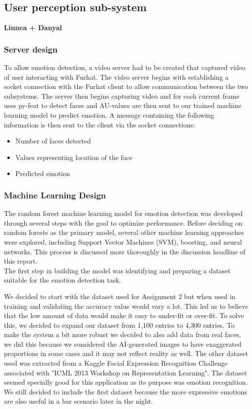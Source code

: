 \documentclass[conference]{IEEEtran}
\begin{document}
\subsection{User perception sub-system}
\textbf{Linnea + Danyal}
\subsubsection{Server design}\label{sec:serverdesign}
To allow emotion detection, a video server had to be created that captured video of user interacting with Furhat. The video server begins with establishing a socket connection with the Furhat client to allow communication between the two subsystems. The server then begins capturing video and for each current frame uses py-feat to detect faces and AU-values are then sent to our trained machine learning model to predict emotion. A message containing the following information is then sent to the client via the socket connections:
\begin{itemize}
    \item Number of faces detected
    \item Values representing location of the face
    \item Predicted emotion
\end{itemize}
\subsubsection{Machine Learning Design}
The random forest machine learning model for emotion detection was developed through several steps with the goal to optimize performance. Before deciding on random forests as the primary model, several other machine learning approaches were explored, including Support Vector Machines (SVM), boosting, and neural networks. This process is discussed more thoroughly in the discussion headline of this report.\\ The first step in building the model was identifying and preparing a dataset suitable for the emotion detection task.

We decided to start with the dataset used for Assignment 2 but when used in training and validating the accuracy value would vary a lot. This led us to believe that the low amount of data would make it easy to under-fit or over-fit. To solve this, we decided to expand our dataset from 1,100 entries to 4,300 entries. To make the system a bit more robust we decided to also add data from real faces, we did this because we considered the AI-generated images to have exaggerated proportions in some cases and it may not reflect reality as well. The other dataset used was extracted from a Kaggle Facial Expression Recognition Challenge \cite{kaggle} associated with "ICML 2013 Workshop on Representation Learning". The dataset seemed specially good for this application as its purpose was emotion recognition.
We still decided to include the first dataset because the more expressive emotions are also useful in a bar scenario later in the night.
\end{document}
